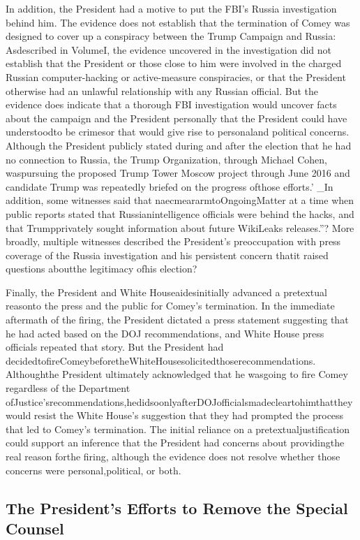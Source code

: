 {In addition, the President had a motive to put the FBI’s Russia investigation behind him. The evidence does not establish that the termination of Comey was designed to cover up a conspiracy between the Trump Campaign and Russia: Asdescribed in VolumeI, the evidence uncovered in the investigation did not establish that the President or those close to him were involved in the charged Russian computer-hacking or active-measure conspiracies, or that the President otherwise had an unlawful relationship with any Russian official. But the evidence does indicate that a thorough FBI investigation would uncover facts about the campaign and the President personally that the President could have understoodto be crimesor that would give rise to personaland political concerns. Although the President publicly stated during and after the election that he had no connection to Russia, the Trump Organization, through Michael Cohen, waspursuing the proposed Trump Tower Moscow project through June 2016 and candidate Trump was repeatedly briefed on the progress ofthose efforts.’ _In addition, some witnesses said that naecmeararmtoOngoingMatter
at a time when public reports stated that Russianintelligence officials were behind the hacks, and that Trumpprivately sought information about future WikiLeaks releases.”? More broadly, multiple witnesses described the President’s preoccupation with press coverage of the Russia investigation and his persistent concern thatit raised questions aboutthe legitimacy ofhis election?

Finally, the President and White Houseaidesinitially advanced a pretextual reasonto the press and the public for Comey’s termination. In the immediate aftermath of the firing, the President dictated a press statement suggesting that he had acted based on the DOJ recommendations, and White House press officials repeated that story. But the President had decidedtofireComeybeforetheWhiteHousesolicitedthoserecommendations. Althoughthe President ultimately acknowledged that he wasgoing to fire Comey regardless of the Department ofJustice’srecommendations,hedidsoonlyafterDOJofficialsmadecleartohimthattheywould resist the White House’s suggestion that they had prompted the process that led to Comey’s termination. The initial reliance on a pretextualjustification could support an inference that the President had concerns about providingthe real reason forthe firing, although the evidence does not resolve whether those concerns were personal,political, or both.

\subsection{The President's Efforts to Remove the Special Counsel}

}
